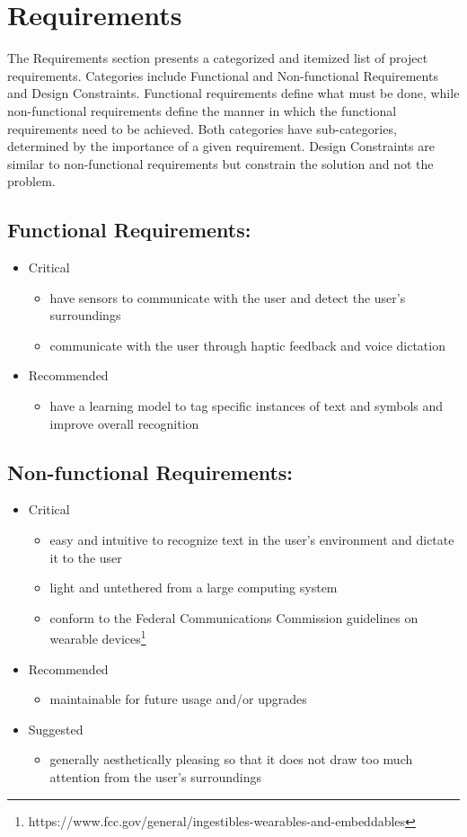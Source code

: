 \chapter{Requirements}
The Requirements section presents a categorized and itemized list of project requirements. Categories include Functional and Non-functional Requirements and Design Constraints. Functional requirements define what must be done, while non-functional requirements define the manner in which the functional requirements need to be achieved. Both categories have sub-categories, determined by the importance of a given requirement. Design Constraints are similar to non-functional requirements but constrain the solution and not the problem.
\section{Functional Requirements:}
\begin{itemize}
\item Critical
	\begin{itemize}
	\item have sensors to communicate with the user and detect the user’s surroundings
	\item communicate with the user through haptic feedback and voice dictation
    \end{itemize}
\item Recommended
	\begin{itemize}
	\item have a learning model to tag specific instances of text and symbols and improve overall recognition
	\end{itemize}
\end{itemize}

\pagebreak

\section{Non-functional Requirements:}
\begin{itemize}
\item Critical
	\begin{itemize}
	\item easy and intuitive to recognize text in the user’s environment and dictate it to the user
	\item light and untethered from a large computing system
	\item conform to the Federal Communications Commission guidelines on wearable devices\footnote{https://www.fcc.gov/general/ingestibles-wearables-and-embeddables}
    \end{itemize}
\item Recommended
	\begin{itemize}
	\item maintainable for future usage and/or upgrades
	\end{itemize}
\item Suggested
    \begin{itemize}
	\item generally aesthetically pleasing so that it does not draw too much attention from the user’s surroundings
	\end{itemize}
\end{itemize}

